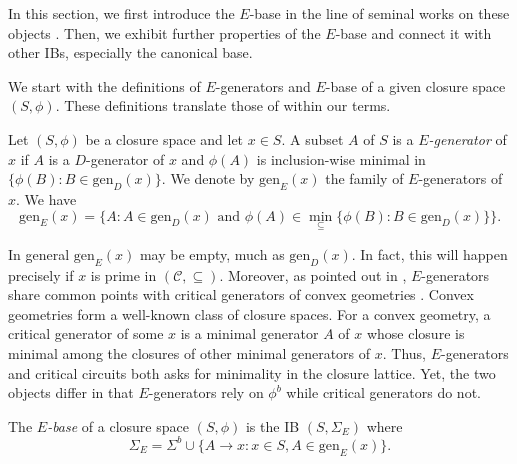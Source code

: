 \documentclass[12pt, a4paper]{article}
\newcommand{\cc}[1]{\mathcal{#1}}  %
\newcommand{\st}{:}  %
\newcommand{\U}{S}  %
\newcommand{\cl}{\phi}  %
\newcommand{\cs}{\cc{C}} %
\newcommand{\gen}{\mathrm{gen}}  %
\newcommand{\imp}{\rightarrow}  %
\newcommand{\is}{\Sigma}  %
\begin{document}
In this section, we first introduce the $E$-base in the line of seminal works on these objects \cite{adaricheva2013ordered,freese1995free}.
Then, we exhibit further properties of the $E$-base and connect it with other IBs, especially the canonical base.

We start with the definitions of $E$-generators and $E$-base of a given closure space $(\U, \cl)$.
These definitions translate those of \cite{adaricheva2013ordered,freese1995free} within our terms.

\begin{definition}[$E$-generator] \label{def:E-generator}
Let $(\U, \cl)$ be a closure space and let $x \in \U$.
A subset $A$ of $\U$ is a \emph{$E$-generator} of $x$ if $A$ is a $D$-generator of $x$ and $\cl(A)$ is inclusion-wise minimal in $\{\cl(B) \st B \in \gen_D(x)\}$.
We denote by $\gen_E(x)$ the family of $E$-generators of $x$. We have
%
\[
\gen_E(x) = \{A \st A \in \gen_D(x) \text{ and } \cl(A) \in \min_{\subseteq}\{\cl(B) \st B \in \gen_D(x)\}\}.
\]
%
\end{definition}

In general $\gen_E(x)$ may be empty, much as $\gen_D(x)$.
In fact, this will happen precisely if $x$ is prime in $(\cs, \subseteq)$.
Moreover, as pointed out in \cite{wild2017joy}, $E$-generators share common points with critical generators of convex geometries \cite{korte2012greedoids}.
Convex geometries form a well-known class of closure spaces.
For a convex geometry, a critical generator of some $x$ is a minimal generator $A$ of $x$ whose closure is minimal among the closures of other minimal generators of $x$.
Thus, $E$-generators and critical circuits both asks for minimality in the closure lattice.
Yet, the two objects differ in that $E$-generators rely on $\cl^b$ while critical generators do not.

\begin{definition}[$E$-base] \label{def:E-base}
The \emph{$E$-base} of a closure space $(\U, \cl)$ is the IB $(\U, \is_E)$ where
%
\[ 
\is_E = \is^b \cup \{A \imp x \st x \in \U, A \in \gen_E(x)\}.
\]
%
\end{definition}
\end{document}
